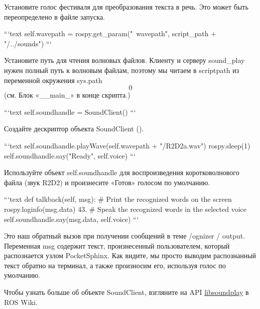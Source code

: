 Установите голос фестиваля для преобразования текста в речь. Это может быть переопределено в файле запуска.

```text
self.wavepath = rospy.get_param("~wavepath", script_path + "/../sounds")
```

Установите путь для чтения волновых файлов. Клиенту и серверу sound_play нужен полный путь к волновым файлам, поэтому мы читаем в scriptpath из переменной окружения sys.path \[0\] (см. Блок «\_\_main_» в конце скрипта.)

```text
self.soundhandle = SoundClient()
```

Создайте дескриптор объекта SoundClient ().

```text
self.soundhandle.playWave(self.wavepath + "/R2D2a.wav")
rospy.sleep(1)
self.soundhandle.say("Ready", self.voice)
```

Используйте объект self.soundhandle для воспроизведения коротковолнового файла (звук R2D2) и произнесите «Готов» голосом по умолчанию.

```text
def talkback(self, msg):
# Print the recognized words on the screen
rospy.loginfo(msg.data) 43.
# Speak the recognized words in the selected voice
self.soundhandle.say(msg.data, self.voice)
```

Это наш обратный вызов при получении сообщений в теме /ognizer / output. Переменная msg содержит текст, произнесенный пользователем, который распознается узлом PocketSphinx. Как видите, мы просто выводим распознанный текст обратно на терминал, а также произносим его, используя голос по умолчанию.

Чтобы узнать больше об объекте SoundClient, взгляните на API \href{http://www.ros.org/doc/api/sound_play/html/libsoundplay_8py_source.html}{libsoundplay} в ROS Wiki.



